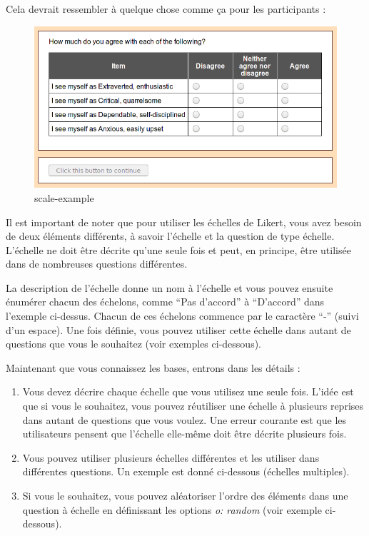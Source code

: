 \documentclass[
]{book}
\providecommand{\tightlist}{%
  \setlength{\itemsep}{0pt}\setlength{\parskip}{0pt}}
\begin{document}
Cela devrait ressembler à quelque chose comme ça pour les participants :

\begin{figure}
\centering
\includegraphics{img/scale-example.png}
\caption{scale-example}
\end{figure}

Il est important de noter que pour utiliser les échelles de Likert, vous
avez besoin de deux éléments différents, à savoir l'échelle et la
question de type échelle. L'échelle ne doit être décrite qu'une seule
fois et peut, en principe, être utilisée dans de nombreuses questions
différentes.

La description de l'échelle donne un nom à l'échelle et vous pouvez
ensuite énumérer chacun des échelons, comme ``Pas d'accord'' à
``D'accord'' dans l'exemple ci-dessus. Chacun de ces échelons commence
par le caractère ``-'' (suivi d'un espace). Une fois définie, vous
pouvez utiliser cette échelle dans autant de questions que vous le
souhaitez (voir exemples ci-dessous).

Maintenant que vous connaissez les bases, entrons dans les détails :

\begin{enumerate}
\def\labelenumi{\arabic{enumi}.}
\tightlist
\item
  Vous devez décrire chaque échelle que vous utilisez une seule fois.
  L'idée est que si vous le souhaitez, vous pouvez réutiliser une
  échelle à plusieurs reprises dans autant de questions que vous voulez.
  Une erreur courante est que les utilisateurs pensent que l'échelle
  elle-même doit être décrite plusieurs fois.
\item
  Vous pouvez utiliser plusieurs échelles différentes et les utiliser
  dans différentes questions. Un exemple est donné ci-dessous (échelles
  multiples).
\item
  Si vous le souhaitez, vous pouvez aléatoriser l'ordre des éléments
  dans une question à échelle en définissant les options \emph{o:
  random} (voir exemple ci-dessous).
\end{enumerate}
\end{document}
